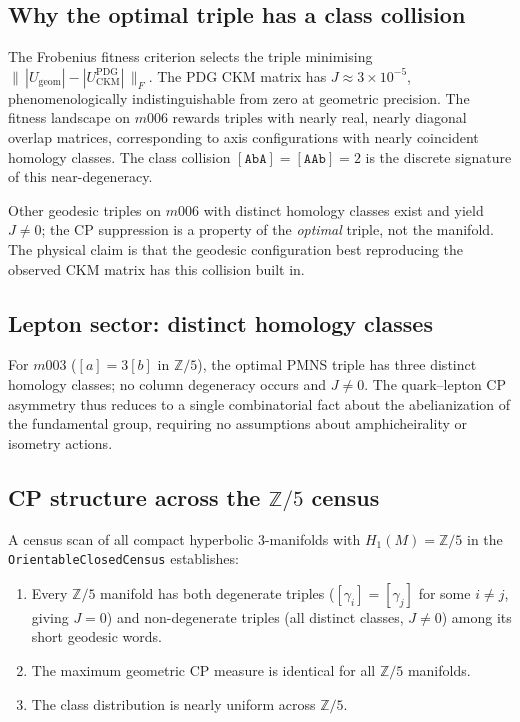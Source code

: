 \documentclass[12pt]{article}
\theoremstyle{definition}
\begin{document}
\subsection{Why the optimal triple has a class collision}

The Frobenius fitness criterion selects the triple minimising
$\|\,|U_\text{geom}|-|U_\text{CKM}^\text{PDG}|\,\|_F$.
The PDG CKM matrix has $J\approx 3\times 10^{-5}$, phenomenologically
indistinguishable from zero at geometric precision.
The fitness landscape on $m006$ rewards triples with nearly real,
nearly diagonal overlap matrices, corresponding to axis configurations
with nearly coincident homology classes.
The class collision $[\texttt{AbA}]=[\texttt{AAb}]=2$ is the discrete
signature of this near-degeneracy.

Other geodesic triples on $m006$ with distinct homology classes exist
and yield $J\neq 0$; the CP suppression is a property of the
\emph{optimal} triple, not the manifold.
The physical claim is that the geodesic configuration best reproducing
the observed CKM matrix has this collision built in.

\subsection{Lepton sector: distinct homology classes}

For $m003$ ($[a]=3[b]$ in $\mathbb{Z}/5$), the optimal PMNS triple
has three distinct homology classes; no column degeneracy occurs
and $J\neq 0$.
The quark--lepton CP asymmetry thus reduces to a single combinatorial
fact about the abelianization of the fundamental group, requiring
no assumptions about amphicheirality or isometry actions.


\subsection{CP structure across the $\mathbb{Z}/5$ census}
\label{subsec:z5_census}

A census scan of all compact hyperbolic 3-manifolds with $H_1(M)=\mathbb{Z}/5$ in the \texttt{OrientableClosedCensus} establishes:
\begin{enumerate}
\item Every $\mathbb{Z}/5$ manifold has both degenerate triples
($[\gamma_i]=[\gamma_j]$ for some $i\neq j$, giving $J=0$) and
non-degenerate triples (all distinct classes, $J\neq 0$) among its short geodesic words.
\item The maximum geometric CP measure is identical for all $\mathbb{Z}/5$ manifolds.
\item The class distribution is nearly uniform across $\mathbb{Z}/5$.
\end{enumerate}
\end{document}
